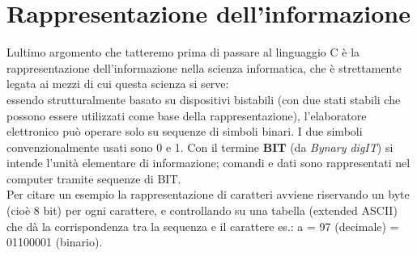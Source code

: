 \section{Rappresentazione dell'informazione}
Lultimo argomento che tatteremo prima di passare al linguaggio C è la rappresentazione dell'informazione nella scienza informatica, che è strettamente legata ai mezzi di cui questa scienza si serve:\\
essendo strutturalmente basato su dispositivi bistabili (con due stati stabili che possono essere utilizzati come base della rappresentazione), l'elaboratore elettronico può operare solo su sequenze di simboli binari. I due simboli convenzionalmente usati sono 0 e 1. Con il termine \textbf{BIT} (da \textit{Bynary digIT}) si intende l’unità elementare di informazione; comandi e dati sono rappresentati nel computer tramite sequenze di BIT. %
\\Per citare un esempio la rappresentazione di caratteri avviene riservando un byte (cioè 8 bit) per ogni carattere, e controllando su una tabella (extended ASCII) che dà la corrispondenza tra la sequenza e il carattere es.: a = 97 (decimale) = 01100001 (binario).


